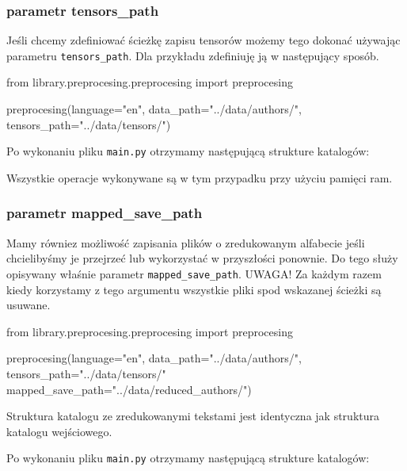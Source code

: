\newpage
\subsubsection{parametr tensors\_path}
Jeśli chcemy zdefiniować ścieżkę zapisu tensorów możemy tego dokonać używając parametru 
\texttt{tensors\_path}. Dla przykładu zdefiniuję ją w następujący sposób. 
\begin{python}
from library.preprocesing.preprocesing import preprocesing

preprocesing(language="en",
              data_path="../data/authors/",
              tensors_path="../data/tensors/")
                   
\end{python}

Po wykonaniu pliku \texttt{main.py} otrzymamy następującą strukture katalogów:
\myspace
{}
\myspace

Wszystkie operacje wykonywane są w tym przypadku przy użyciu pamięci ram.


\subsubsection{parametr mapped\_save\_path}
Mamy równiez możliwość zapisania plików o zredukowanym alfabecie jeśli chcielibyśmy je przejrzeć lub
wykorzystać w przyszłości ponownie. Do tego służy opisywany właśnie parametr \texttt{mapped\_save\_path}.
UWAGA! Za każdym razem kiedy korzystamy z tego argumentu wszystkie pliki spod wskazanej ścieżki są 
usuwane.

\begin{python}
from library.preprocesing.preprocesing import preprocesing

preprocesing(language="en",
              data_path="../data/authors/",
              tensors_path="../data/tensors/"
              mapped_save_path="../data/reduced_authors/")
                   
\end{python}
Struktura katalogu ze zredukowanymi tekstami jest identyczna jak struktura katalogu wejściowego. 

Po wykonaniu pliku \texttt{main.py} otrzymamy następującą strukture katalogów:

\myspace
{}
\myspace

